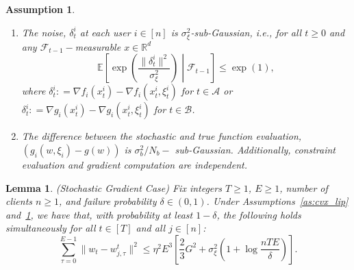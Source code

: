 \documentclass[10pt,a4paper]{amsart}
\newtheorem{assumption}{Assumption}
\newtheorem{lemma}{Lemma}
\def\A{{\mathcal A}}
\def\B{{\mathcal B}}
\begin{document}
\begin{assumption}
    \label{as:sgd_noise_bound}
    \begin{enumerate}
        \item The noise, $\delta_t^i$ at each user $i \in [n]$ is $\sigma_\xi^2$-sub-Gaussian, i.e., for all $t \ge 0$ and any $\mathcal{F}_{t-1}-$measurable $x \in \mathbb{R}^d$
        \[
        \mathbb{E} \left[ \exp \left( \frac{\|\delta_t^i\|^2}{\sigma_\xi^2} \right) \middle| \mathcal{F}_{t-1} \right] \le \exp(1),
        \]
        where $\delta_t^i : = \nabla f_i(x_t^i) - \nabla f_i(x_t^i,\xi_t^i)$ for $t \in \A$ or $\delta_t^i : = \nabla g_i(x_t^i) - \nabla g_i(x_t^i,\xi_t^i)$ for $t \in \B$.
        \item The difference between the stochastic and true function evaluation, $(g_i(w,\xi_i) - g(w))$ is $\sigma_b^2/N_b-$ sub-Gaussian. Additionally, constraint evaluation and gradient computation are independent.
    \end{enumerate}
\end{assumption}

\begin{lemma}(Stochastic Gradient Case)
\label{lem:iterate_diff_stoch}
Fix integers $T \ge 1$, $E \ge 1$, number of clients $n \ge 1$, and failure probability $\delta \in (0,1)$.
Under Assumptions~\ref{as:cvx_lip} and~\ref{as:sgd_noise_bound}, we have that, with probability at least $1-\delta$, the following holds {simultaneously for all} $t \in [T]$ and all $j \in [n]$:
\begin{equation}
    \label{eq:local_drift_bound}
    \sum_{\tau=0}^{E-1} \bigl\|w_t - w_{j,\tau}^t\bigr\|^2
    \le
    \eta^2 E^3\left[
    \frac{2}{3}G^2 + \sigma_\xi^2\left(1 + \log\frac{nTE}{\delta}\right)
    \right].
\end{equation}
\end{lemma}
\end{document}
